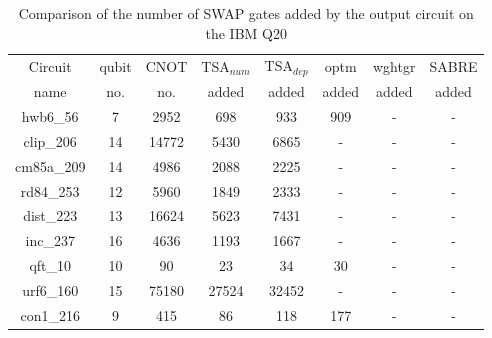 \documentclass[runningheads]{llncs}
\begin{document}
				\begin{table}[H]
					\label{tab5}
					\begin{center}  
					\begin{tabular}{|c|c|c|c|c|c|c|c|}
					\hline
					Circuit &  qubit  & CNOT &TSA$_{num}$& TSA$_{dep}$  & optm 	 & wghtgr  &SABRE 	\\
					 name	&   no. 	&	no. & added&  added &  added 	&  added&  added\\
					\hline
					hwb6\_56 & 7 & 2952 & 698 & 933 & 909 & -& - \\
clip\_206 & 14 & 14772 & 5430 & 6865 & - & -& - \\
cm85a\_209 & 14 & 4986 & 2088 & 2225 & - & -& - \\
rd84\_253 & 12 & 5960 & 1849 & 2333 & - & -& - \\
dist\_223 & 13 & 16624 & 5623 & 7431 & - & -& - \\
inc\_237 & 16 & 4636 & 1193 & 1667 & - & -& - \\
qft\_10 & 10 & 90 & 23 & 34 & 30 & -& - \\
urf6\_160 & 15 & 75180 & 27524 & 32452 & - & -& - \\
con1\_216 & 9 & 415 & 86 & 118 & 177 & -& - \\
					\hline
					\end{tabular} 
					\end{center}	
					\caption{Comparison of  the number of  SWAP gates added by the 
					output circuit on the IBM Q20 }  
					\label{tab5}
					\end{table}
\end{document}
